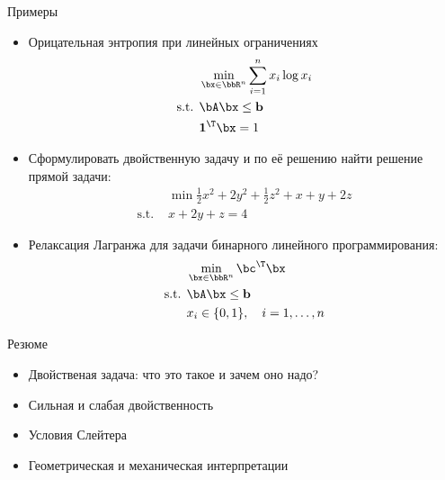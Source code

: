 \documentclass[12pt,russian]{beamer}
\begin{document}
\begin{frame}{Примеры}
\footnotesize
\begin{itemize}
\item Орицательная энтропия при линейных ограничениях
\vspace{-5mm}
\begin{equation*}
\begin{split}
& \min\limits_{\bx \in \bbR^n} \sum\limits_{i=1}^n x_i \log x_i\\
\text{s.t. } & \bA\bx \leq \mathbf{b}\\
& \mathbf{1}^{\T}\bx = 1
\end{split}
\end{equation*} 
\item Сформулировать двойственную задачу и по её решению найти решение прямой задачи:
\begin{equation*}
\begin{split}
& \min \frac{1}{2}x^2 + 2y^2 + \frac{1}{2}z^2 + x + y + 2z\\
\text{s.t. } & x+2y+z = 4
\end{split}
\end{equation*}
\item Релаксация Лагранжа для задачи бинарного линейного программирования:
\begin{equation*}
\begin{split}
&\min\limits_{\bx \in \bbR^n} \bc^{\T}\bx\\
\text{s.t. } & \bA \bx \leq \mathbf{b}\\
& x_i \in \{0,1 \}, \quad i = 1,\ldots,n
\end{split}
\end{equation*}
\end{itemize}
\end{frame}

\begin{frame}{Резюме}
\begin{itemize}
\item Двойственая задача: что это такое и зачем оно надо?
\item Сильная и слабая двойственность
\item Условия Слейтера
\item Геометрическая и механическая интерпретации
\end{itemize}
\end{frame}
\end{document}
